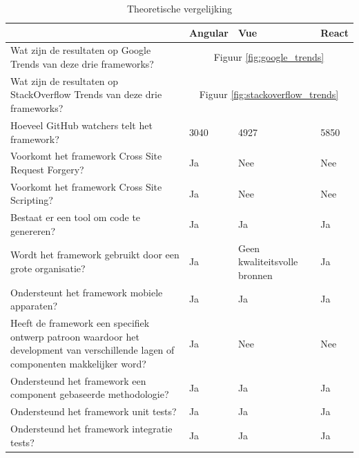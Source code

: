 \begin{table}[]
	\centering
	\caption{Theoretische vergelijking}
	\label{table:theoretische_vergelijking}
	\begin{tabular}{|p{7cm}||p{2cm}|p{2cm}|p{2cm}|}
		\hline
		&Angular &Vue   &React \\ \hline \hline
		Wat zijn de resultaten op Google Trends van deze drie frameworks?
		&\multicolumn{3}{c|}{Figuur \ref{fig:google_trends}}\\ \hline
		Wat zijn de resultaten op StackOverflow Trends van deze drie frameworks?
		&\multicolumn{3}{c|}{Figuur \ref{fig:stackoverflow_trends}}\\ \hline
		Hoeveel GitHub watchers telt het framework? \autocite{github_front-end_????} 
		&3040     &4927  &5850 \\ \hline
		Voorkomt het framework Cross Site Request Forgery? \autocite{_angular_2018-1}
		&Ja         &Nee    &Nee \\ \hline
		Voorkomt het framework Cross Site Scripting? \autocite{_angular_2018-1}
		&Ja         &Nee    &Nee \\ \hline
		Bestaat er een tool om code te genereren?
		&Ja         &Ja     &Ja       \\ \hline
		Wordt het framework gebruikt door een grote organisatie? \autocite{_made_????} \autocite{_made_????-1}
		&Ja         &Geen kwaliteitsvolle bronnen &Ja \\ \hline
		Ondersteunt het framework mobiele apparaten?
		&Ja         &Ja     &Ja       \\ \hline
		Heeft de framework een specifiek ontwerp patroon waardoor het development van verschillende lagen of componenten makkelijker word?
		&Ja         &Nee   &Nee       \\ \hline
		Ondersteund het framework een component gebaseerde methodologie?
		&Ja         &Ja     &Ja       \\ \hline
		Ondersteund het framework unit tests? \autocite{_testing_2018} \autocite{_testing_2018-2} \autocite{_testing_2018-1}
		&Ja         &Ja     &Ja       \\ \hline
		Ondersteund het framework integratie tests?
		&Ja         &Ja     &Ja      \\  \hline
	\end{tabular}
\end{table}

